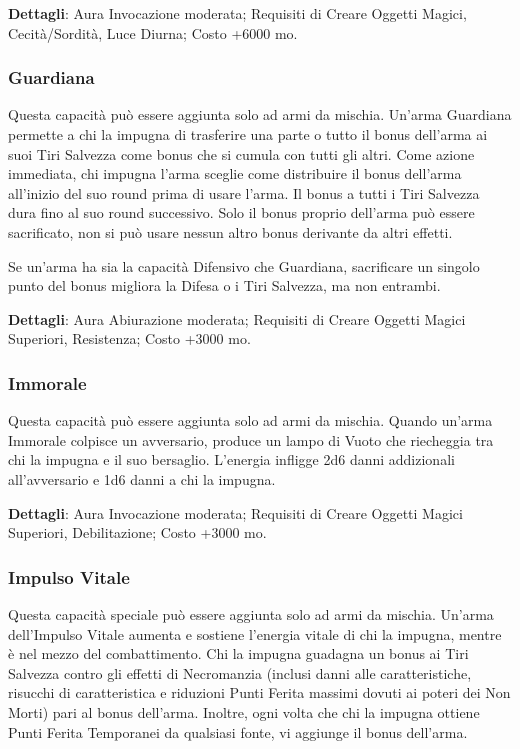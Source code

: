 \begin{multicols}{2}
	\textbf{Dettagli}: Aura Invocazione moderata; Requisiti di Creare Oggetti Magici, Cecità/Sordità, Luce Diurna; Costo +6000 mo.

	\subsubsection*{Guardiana}

	Questa capacità può essere aggiunta solo ad armi da mischia. Un'arma Guardiana permette a chi la impugna di trasferire una parte o tutto il bonus dell'arma ai suoi Tiri Salvezza come bonus che si cumula con tutti gli altri. Come azione immediata, chi impugna l'arma sceglie come distribuire il bonus dell'arma all'inizio del suo round prima di usare l'arma. Il bonus a tutti i Tiri Salvezza dura fino al suo round successivo. Solo il bonus proprio dell'arma può essere sacrificato, non si può usare nessun altro bonus derivante da altri effetti.

	Se un'arma ha sia la capacità Difensivo che Guardiana, sacrificare un singolo punto del bonus migliora la Difesa o i Tiri Salvezza, ma non entrambi.

	\textbf{Dettagli}: Aura Abiurazione moderata; Requisiti di Creare Oggetti Magici Superiori, Resistenza; Costo +3000 mo.

	\subsubsection*{Immorale}

	Questa capacità può essere aggiunta solo ad armi da mischia. Quando un'arma Immorale colpisce un avversario, produce un lampo di Vuoto che riecheggia tra chi la impugna e il suo bersaglio. L'energia infligge 2d6 danni addizionali all'avversario e 1d6 danni a chi la impugna.

	\textbf{Dettagli}: Aura Invocazione moderata; Requisiti di Creare Oggetti Magici Superiori, Debilitazione; Costo +3000 mo.

	\subsubsection*{Impulso Vitale}

	Questa capacità speciale può essere aggiunta solo ad armi da mischia. Un'arma dell'Impulso Vitale aumenta e sostiene l'energia vitale di chi la impugna, mentre è nel mezzo del combattimento. Chi la impugna guadagna un bonus ai Tiri Salvezza contro gli effetti di Necromanzia (inclusi danni alle caratteristiche, risucchi di caratteristica e riduzioni Punti Ferita massimi dovuti ai poteri dei Non Morti) pari al bonus dell'arma. Inoltre, ogni volta che chi la impugna ottiene Punti Ferita Temporanei da qualsiasi fonte, vi aggiunge il bonus dell'arma.


\end{multicols}

